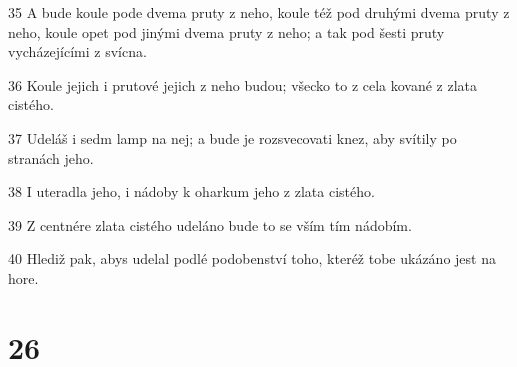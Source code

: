 \par 35 A bude koule pode dvema pruty z neho, koule též pod druhými dvema pruty z neho, koule opet pod jinými dvema pruty z neho; a tak pod šesti pruty vycházejícími z svícna.
\par 36 Koule jejich i prutové jejich z neho budou; všecko to z cela kované z zlata cistého.
\par 37 Udeláš i sedm lamp na nej; a bude je rozsvecovati knez, aby svítily po stranách jeho.
\par 38 I uteradla jeho, i nádoby k oharkum jeho z zlata cistého.
\par 39 Z centnére zlata cistého udeláno bude to se vším tím nádobím.
\par 40 Hlediž pak, abys udelal podlé podobenství toho, kteréž tobe ukázáno jest na hore.

\chapter{26}

